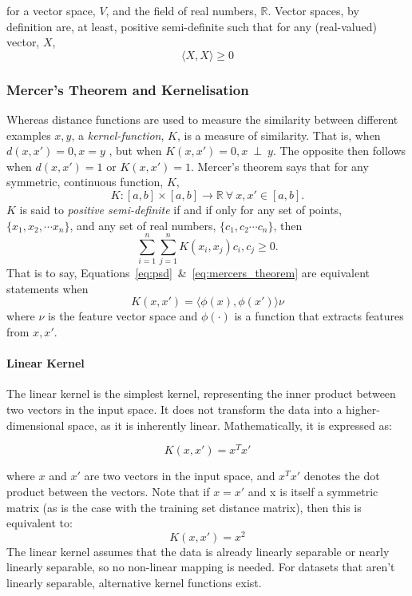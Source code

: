 \documentclass[conference]{IEEEtran}
\begin{document}
for a vector space, $V$, and the field of real numbers, $\mathbb{R}$. 
Vector spaces, by definition are, at least, positive semi-definite such that for any (real-valued) vector, $X$, 
\begin{equation}
\langle X, X \rangle \geq 0
\label{eq:psd}
\end{equation}

\subsubsection{Mercer's Theorem and Kernelisation}
\label{kernels}
Whereas distance functions are used to measure the similarity between different examples $x,y$, a \textit{kernel-function}, $K$, is a measure of similarity. That is, when $d(x,x') = 0, x = y$ , but when $K(x,x') = 0, x~\perp~y$. The opposite then follows when $d(x,x')=1$ or $K(x,x')=1$. Mercer's theorem says that for any symmetric, continuous function, $K$,
$$
K : [a, b] \times [a, b] \rightarrow \mathbb{R}~\forall~x,x' \in [a,b].
$$
$K$ is said to \textit{positive semi-definite} if and if only for any set of points, $\{x_1, x_2, \cdots x_n\}$, and any set of real numbers, $\{ c_1, c_2 \cdots c_n\}$, then
\begin{equation}
\sum_{i=1}^n \sum_{j=1}^n K(x_i, x_j) c_i, c_j \geq 0.
\label{eq:mercers_theorem}
\end{equation}
That is to say, Equations~\ref{eq:psd}~\&~\ref{eq:mercers_theorem} are equivalent statements when 
$$
K(x, x') = \langle \phi(x), \phi(x') \rangle \nu
$$
where $\nu$ is the feature vector space and $\phi(\cdot)$ is a function that extracts features from $x,x'$.

\paragraph{Linear Kernel}
\label{linear_kernel}
The linear kernel is the simplest kernel, representing the inner product between two vectors in the input space. It does not transform the data into a higher-dimensional space, as it is inherently linear. Mathematically, it is expressed as:

$$
K(x, x') = x^T x'
$$

where $x$ and $x'$ are two vectors in the input space, and $x^T x'$ denotes the dot product between the vectors. 
Note that if $x = x'$ and x is itself a symmetric matrix (as is the case with the training set distance matrix), then this is equivalent to:
$$
K(x, x') = x^2
$$
The linear kernel assumes that the data is already linearly separable or nearly linearly separable, so no non-linear mapping is needed. 
For datasets that aren't linearly separable, alternative kernel functions exist. 
\end{document}
